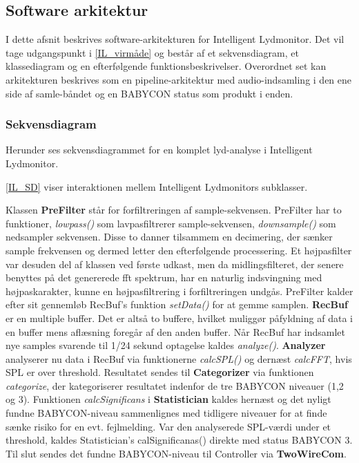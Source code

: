 \newpage
\subsection{Software arkitektur}
I dette afsnit beskrives software-arkitekturen for Intelligent Lydmonitor. Det vil tage udgangspunkt i \ref{IL_virmåde} og består af et sekvensdiagram, et klassediagram og en efterfølgende funktionsbeskrivelser. Overordnet set kan arkitekturen beskrives som en pipeline-arkitektur med audio-indsamling i den ene side af samle-båndet og en BABYCON status som produkt i enden.

\subsubsection*{Sekvensdiagram}
Herunder ses sekvensdiagrammet for en komplet lyd-analyse i Intelligent Lydmonitor.

\ref{IL_SD} viser interaktionen mellem Intelligent Lydmonitors subklasser.

Klassen \textbf{PreFilter} står for forfiltreringen af sample-sekvensen. PreFilter har to funktioner, \textit{lowpass()} som lavpasfiltrerer sample-sekvensen, \textit{downsample()} som nedsampler sekvensen. Disse to danner tilsammem en decimering, der sænker sample frekvensen og dermed letter den efterfølgende processering. Et højpasfilter var desuden del af klassen ved første udkast, men da midlingsfilteret, der senere benyttes på det genererede fft spektrum, har en naturlig indsvingning med højpaskarakter, kunne en højpasfiltrering i forfiltreringen undgås. PreFilter kalder efter sit gennemløb RecBuf's funktion \textit{setData()} for at gemme samplen.
\textbf{RecBuf} er en multiple buffer. Det er altså to buffere, hvilket muliggør påfyldning af data i en buffer mens aflæsning foregår af den anden buffer. Når RecBuf har indsamlet nye samples svarende til 1/24 sekund optagelse kaldes \textit{analyze()}. \textbf{Analyzer} analyserer nu data i RecBuf via funktionerne \textit{calcSPL()} og dernæst \textit{calcFFT}, hvis SPL er over threshold. Resultatet sendes til \textbf{Categorizer} via funktionen \textit{categorize}, der kategoriserer resultatet indenfor de tre BABYCON niveauer (1,2 og 3). Funktionen \textit{calcSignificans} i \textbf{Statistician} kaldes hernæst og det nyligt fundne BABYCON-niveau sammenlignes med tidligere niveauer for at finde sænke risiko for en evt. fejlmelding. Var den analyserede SPL-værdi under et threshold, kaldes Statistician's calSignificanas() direkte med status BABYCON 3. Til slut sendes det fundne BABYCON-niveau til Controller via \textbf{TwoWireCom}. 

